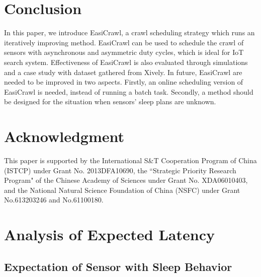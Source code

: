 \documentclass[conference]{IEEEtran}
\begin{document}
\section{Conclusion} \label{conclusion}

In this paper, we introduce EasiCrawl, a crawl scheduling strategy which runs an iteratively improving method. 
EasiCrawl can be used to schedule the crawl of sensors with asynchronous and asymmetric duty cycles, which is ideal for IoT search system. 
Effectiveness of EasiCrawl is also evaluated through simulations and a case study with dataset gathered from Xively. 
In future, EasiCrawl are needed to be improved in two aspects.
Firstly, an online scheduling version of EasiCrawl is needed, instead of running a batch task.
Secondly, a method should be designed for the situation when sensors' sleep plans are unknown. 

\section*{Acknowledgment}

This paper is supported by the International S\&T Cooperation Program of China (ISTCP) under Grant No. 2013DFA10690, the ``Strategic Priority Research Program" of the Chinese Academy of Sciences under Grant No. XDA06010403, and the National Natural Science Foundation of China (NSFC) under Grant No.613203246 and No.61100180.

\ifCLASSOPTIONcaptionsoff
  \newpage
\fi





\appendices
\section{Analysis of Expected Latency}
\subsection{Expectation of Sensor with Sleep Behavior}
\end{document}
